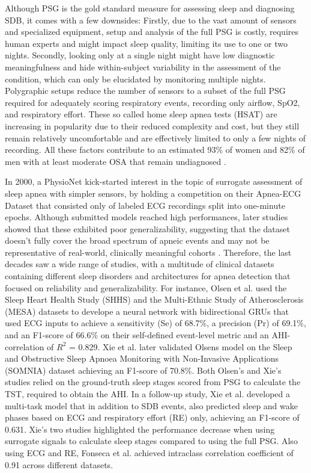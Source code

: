 Although PSG is the gold standard measure for assessing sleep and diagnosing SDB, it comes with a few downsides: Firstly, due to the vast amount of sensors and specialized equipment, setup and analysis of the full PSG is costly, requires human experts and might impact sleep quality, limiting its use to one or two nights. Secondly, looking only at a single night might have low diagnostic meaningfulness \cite{toussaint1995first} and hide within-subject variability in the assessment of the condition, which can only be elucidated by monitoring multiple nights.
Polygraphic setups reduce the number of sensors to a subset of the full PSG required for adequately scoring respiratory events, recording only airflow, SpO2, and respiratory effort. These so called home sleep apnea tests (HSAT) are increasing in popularity due to their reduced complexity and cost, but they still remain relatively uncomfortable and are effectively limited to only a few nights of recording.
All these factors contribute to an estimated 93\% of women and 82\% of men with at least moderate OSA that remain undiagnosed \cite{young1997estimation}.

In 2000, a PhysioNet kick-started interest in the topic of surrogate assessment of sleep apnea with simpler sensors, by holding a competition on their Apnea-ECG Dataset that consisted only of labeled ECG recordings split into one-minute epochs. Although submitted models reached high performances, later studies showed that these exhibited poor generalizability, suggesting that the dataset doesn't fully cover the broad spectrum of apneic events and may not be representative of real-world, clinically meaningful cohorts \cite{papini2018generalizability}. Therefore, the last decades saw a wide range of studies, with a multitude of clinical datasets containing different sleep disorders and architectures for apnea detection that focused on reliability and generalizability.
For instance, Olsen et al. \cite{olsen2020robust} used the Sleep Heart Health Study (SHHS) \cite{quan1997sleep} and the Multi-Ethnic Study of Atherosclerosis (MESA) \cite{chen2015racial} datasets to develope a neural network with bidirectional GRUs that used ECG inputs to achieve a sensitivity (Se) of 68.7\%, a precision (Pr) of 69.1\%, and an F1-score of 66.6\% on their self-defined event-level metric and an AHI-correlation of $R^2$ = 0.829. Xie et al. \cite{xie2023use} later validated Olsens model on the Sleep and Obstructive Sleep Apnoea Monitoring with Non-Invasive Applications (SOMNIA) \cite{van2019protocol} dataset achieving an F1-score of 70.8\%. Both Olsen's and Xie's studies relied on the ground-truth sleep stages scored from PSG to calculate the TST, required to obtain the AHI. In a follow-up study, Xie et al. \cite{xie2024multi} developed a multi-task model that in addition to SDB events, also predicted sleep and wake phases based on ECG and respiratory effort (RE) only, achieving an F1-score of 0.631. Xie's two studies highlighted the performance decrease when using surrogate signals to calculate sleep stages compared to using the full PSG. Also using ECG and RE, Fonseca et al. \cite{fonseca2024estimating} achieved intraclass correlation coefficient of 0.91 across different datasets.

